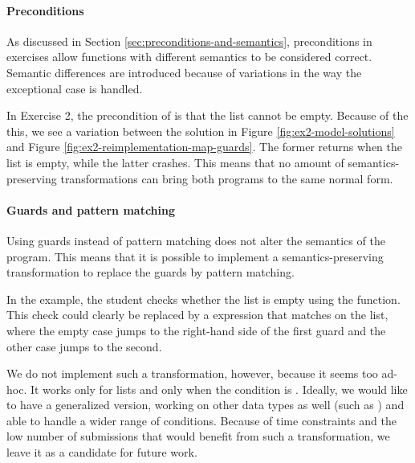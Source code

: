 \paragraph{Preconditions}

As discussed in Section \ref{sec:preconditions-and-semantics}, preconditions in exercises allow functions with different semantics to be considered correct. Semantic differences are introduced because of variations in the way the exceptional case is handled.

In Exercise 2, the precondition of  is that the list cannot be empty. Because of the this, we see a variation between the solution in Figure \ref{fig:ex2-model-solutions} and Figure \ref{fig:ex2-reimplementation-map-guards}. The former returns  when the list is empty, while the latter crashes. This means that no amount of semantics-preserving transformations can bring both programs to the same normal form.


\paragraph{Guards and pattern matching}

Using guards instead of pattern matching does not alter the semantics of the program. This means that it is possible to implement a semantics-preserving transformation to replace the guards by pattern matching.

In the example, the student checks whether the list is empty using the  function. This check could clearly be replaced by a  expression that matches on the list, where the empty case jumps to the right-hand side of the first guard and the other case jumps to the second.

We do not implement such a transformation, however, because it seems too ad-hoc. It works only for lists and only when the condition is . Ideally, we would like to have a generalized version, working on other data types as well (such as ) and able to handle a wider range of conditions. Because of time constraints and the low number of submissions that would benefit from such a transformation, we leave it as a candidate for future work.


